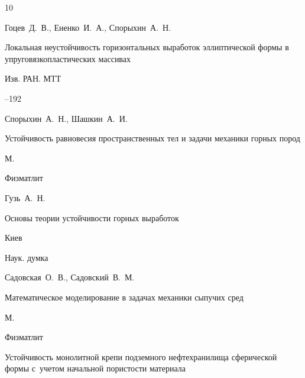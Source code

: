 \begin{thebibliography}{10}




\by Гоцев~Д.~В., Ененко~И.~А., Спорыхин~А.~Н.

\paper Локальная неустойчивость горизонтальных выработок эллиптической формы в упруговязкопластических массивах

\jour Изв. РАН. МТТ




--192





\by Спорыхин~А.~Н., Шашкин~А.~И.

\book Устойчивость равновесия пространственных тел и задачи механики горных пород

\publaddr М.

\publ Физматлит






\by Гузь~А.~Н.

\book Основы теории устойчивости горных выработок

\publaddr Киев

\publ Наук. думка






\by Садовская~О.~В., Садовский~В.~М.

\book Математическое моделирование в задачах механики сыпучих сред

\publaddr М.

\publ Физматлит






\paper Устойчивость монолитной крепи подземного нефтехранилища сферической формы с~учетом начальной пористости материала


\end{thebibliography}
